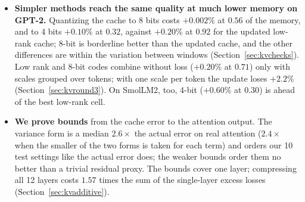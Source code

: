 \documentclass[10pt]{article}
\theoremstyle{plain}
\theoremstyle{definition}
\theoremstyle{remark}
\begin{document}
\begin{itemize}[leftmargin=2em,itemsep=1pt]
\begin{enumerate}[leftmargin=2em,itemsep=0pt,label=(\roman*)]
\item it uses an exact SVD of the prompt; with RSVD it is $+0.3\%$;
\item it does not carry over to the small rotary-position model SmolLM2-135M, where it is $+4.6\%$ and an attention-weighted prompt basis does better ($+1.75\%$; combined with the update, a post hoc choice, $+0.98\%$, confirmed on 16 fresh windows: $+1.15\%$);
\item a larger exact buffer alone does about as well: 128 tokens give $+0.07\%$ on fresh text, at $0.97$ of the memory, statistically indistinguishable from the updated cache.
\end{enumerate}
\item \textbf{Simpler methods reach the same quality at much lower memory on GPT-2.} Quantizing the cache to 8 bits costs $+0.002\%$ at $0.56$ of the memory, and to 4 bits $+0.10\%$ at $0.32$, against $+0.20\%$ at $0.92$ for the updated low-rank cache; 8-bit is borderline better than the updated cache, and the other differences are within the variation between windows (Section~\ref{sec:kvchecks}). Low rank and 8-bit codes combine without loss ($+0.20\%$ at $0.71$) only with scales grouped over tokens; with one scale per token the update loses $+2.2\%$ (Section~\ref{sec:kvround3}). On SmolLM2, too, 4-bit ($+0.60\%$ at $0.30$) is ahead of the best low-rank cell.
\item \textbf{We prove bounds} from the cache error to the attention output. The variance form is a median $2.6\times$ the actual error on real attention ($2.4\times$ when the smaller of the two forms is taken for each term) and orders our 10 test settings like the actual error does; the weaker bounds order them no better than a trivial residual proxy. The bounds cover one layer; compressing all 12 layers costs $1.57$ times the sum of the single-layer excess losses (Section~\ref{sec:kvadditive}).
\end{itemize}
\end{document}
